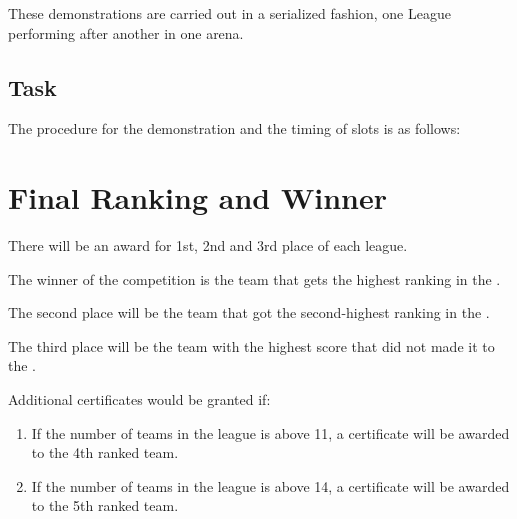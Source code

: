 
These demonstrations are carried out in a serialized fashion, one League performing after another in one arena.


\subsection{Task}
The procedure for the demonstration and the timing of slots is as follows:

\OpenDemonstrationChanges

\section{Final Ranking and Winner}

There will be an award for 1st, 2nd and 3rd place of each league.

The winner of the competition is the team that gets the highest ranking in the .

The second place will be the team that got the second-highest ranking in the .

The third place will be the team with the highest score that did not made it to the .

Additional certificates would be granted if:

\begin{enumerate}
  \item If the number of teams in the league is above 11, a certificate will be awarded to the 4th ranked team.
  \item If the number of teams in the league is above 14, a certificate will be awarded to the 5th ranked team.
\end{enumerate}


